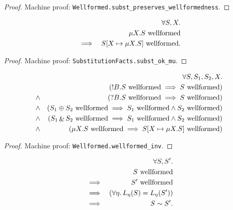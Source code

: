 \documentclass{llncs}
\newcommand*{\sequiv}{\sim}
\newcommand*{\send}{\mathord{!}}
\newcommand*{\recv}{\mathord{?}}
\newcommand*{\echoice}{\oplus}
\newcommand*{\ichoice}{\mathop{\&}}
\newcommand*{\wf}[1]{\text{$#1$ {\normalfont \rmfamily wellformed}}}
\renewcommand*{\|}{\;|\;}
\newcommand*{\machproofc}[1]{Machine proof: \code{#1}.}
\newcommand*{\code}[1]{\texttt{#1}}
\begin{document}
\begin{proof}
  \machproofc{Wellformed.subst\_preserves\_wellformedness}
\end{proof}


\begin{lemma}
  \label{lemma:mu_expansion_wellformedness}
  \begin{eqnarray*}
    &&         \forall S, X. \\
    &&         \wf{\mu X.S} \\
    &\implies& \wf{S[X \mapsto \mu X.S]}.
  \end{eqnarray*}
\end{lemma}

\begin{proof}
  \machproofc{SubstitutionFacts.subst\_ok\_mu}
\end{proof}


\begin{lemma}
  \label{lemma:inversion_wellformedness}
  \begin{eqnarray*}
    &&      \forall S, S_1, S_2, X. \\
    &&      (\wf{\send B.S} \implies \wf{S}) \\
    &\land& (\wf{\recv B.S} \implies \wf{S}) \\
    &\land& (\wf{S_1 \echoice S_2} \implies \wf{S_1} \land \wf{S_2}) \\
    &\land& (\wf{S_1 \ichoice S_2} \implies \wf{S_1} \land \wf{S_2}) \\
    &\land& (\wf{\mu X.S} \implies \wf{S[X \mapsto \mu X.S]})
  \end{eqnarray*}
\end{lemma}

\begin{proof}
  \machproofc{Wellformed.wellformed\_inv}
\end{proof}


\begin{theorem}
  \label{th:equality_equivalence}
  \begin{eqnarray*}
    &&         \forall S, S'. \\
    &&         \wf{S} \\
    &\implies& \wf{S'} \\
    &\implies& (\forall \eta.\, L_\eta(S) = L_\eta(S')) \\
    &\implies& S \sequiv S'.
  \end{eqnarray*}
\end{theorem}
\end{document}
